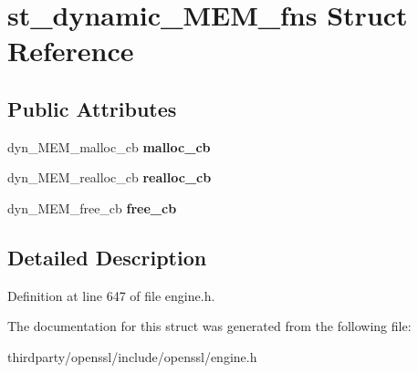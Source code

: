 \hypertarget{structst__dynamic___m_e_m__fns}{}\section{st\+\_\+dynamic\+\_\+\+M\+E\+M\+\_\+fns Struct Reference}
\label{structst__dynamic___m_e_m__fns}
\subsection*{Public Attributes}
\begin{DoxyCompactItemize}
\item 
\mbox{\label{structst__dynamic___m_e_m__fns_af75222a0702aedaf6a9d1156ef9784ed}} 
dyn\+\_\+\+M\+E\+M\+\_\+malloc\+\_\+cb {\bfseries malloc\+\_\+cb}
\item 
\mbox{\label{structst__dynamic___m_e_m__fns_a40fb5719d28a6c452821f0cb0eca231a}} 
dyn\+\_\+\+M\+E\+M\+\_\+realloc\+\_\+cb {\bfseries realloc\+\_\+cb}
\item 
\mbox{\label{structst__dynamic___m_e_m__fns_aa6b8fe1b3872985cac1a62edacc1e983}} 
dyn\+\_\+\+M\+E\+M\+\_\+free\+\_\+cb {\bfseries free\+\_\+cb}
\end{DoxyCompactItemize}


\subsection{Detailed Description}


Definition at line 647 of file engine.\+h.



The documentation for this struct was generated from the following file\+:\begin{DoxyCompactItemize}
\item 
thirdparty/openssl/include/openssl/engine.\+h\end{DoxyCompactItemize}
